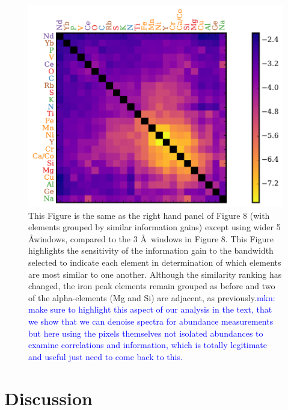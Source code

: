 \documentclass[a4paper,fleqn,usenatbib]{mnras}
\begin{document}
\begin{figure}
	\includegraphics[width=\columnwidth]{apogee_centers_final_29502_spc_sorted_inf_gains_abs_min_tot_dist.pdf}
    \caption{This Figure is the same as the right hand panel of Figure 8 (with elements grouped by similar information gains) except using wider 5 \AA windows, compared to the 3 \AA\ windows in Figure 8.  This Figure highlights the sensitivity of the information gain to the bandwidth selected to indicate each element in determination of which elements are most similar to one another. Although the similarity ranking has changed, the iron peak elements remain grouped as before and two of the alpha-elements (Mg and Si) are adjacent, as previously.\textcolor{blue}{mkn: make sure to highlight this aspect of our analysis in the text, that we show that we can denoise spectra for abundance measurements but here using the pixels themselves not isolated abundances to examine correlations and information, which is totally legitimate and useful just need to come back to this. }}
    \label{fig:all_element_information_wide}
\end{figure}




\section{Discussion}
\end{document}
